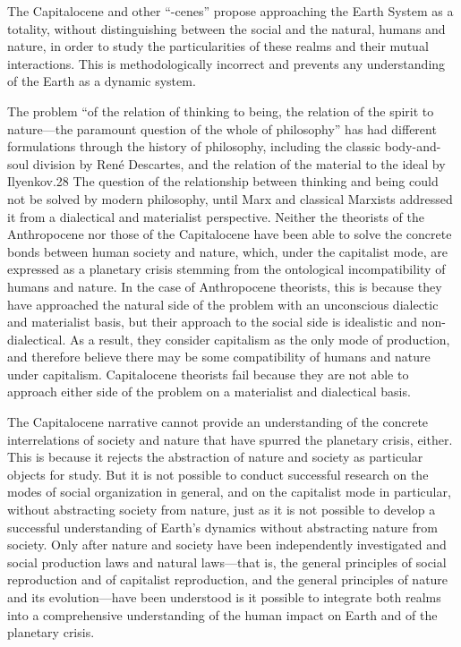 \documentclass[
]{book}
\begin{document}
The Capitalocene and other ``-cenes'' propose approaching the Earth System as a totality, without distinguishing between the social and the natural, humans and nature, in order to study the particularities of these realms and their mutual interactions. This is methodologically incorrect and prevents any understanding of the Earth as a dynamic system.

The problem ``of the relation of thinking to being, the relation of the spirit to nature---the paramount question of the whole of philosophy'' has had different formulations through the history of philosophy, including the classic body-and-soul division by René Descartes, and the relation of the material to the ideal by Ilyenkov.28 The question of the relationship between thinking and being could not be solved by modern philosophy, until Marx and classical Marxists addressed it from a dialectical and materialist perspective. Neither the theorists of the Anthropocene nor those of the Capitalocene have been able to solve the concrete bonds between human society and nature, which, under the capitalist mode, are expressed as a planetary crisis stemming from the ontological incompatibility of humans and nature. In the case of Anthropocene theorists, this is because they have approached the natural side of the problem with an unconscious dialectic and materialist basis, but their approach to the social side is idealistic and non-dialectical. As a result, they consider capitalism as the only mode of production, and therefore believe there may be some compatibility of humans and nature under capitalism. Capitalocene theorists fail because they are not able to approach either side of the problem on a materialist and dialectical basis.

The Capitalocene narrative cannot provide an understanding of the concrete interrelations of society and nature that have spurred the planetary crisis, either. This is because it rejects the abstraction of nature and society as particular objects for study. But it is not possible to conduct successful research on the modes of social organization in general, and on the capitalist mode in particular, without abstracting society from nature, just as it is not possible to develop a successful understanding of Earth's dynamics without abstracting nature from society. Only after nature and society have been independently investigated and social production laws and natural laws---that is, the general principles of social reproduction and of capitalist reproduction, and the general principles of nature and its evolution---have been understood is it possible to integrate both realms into a comprehensive understanding of the human impact on Earth and of the planetary crisis.
\end{document}
